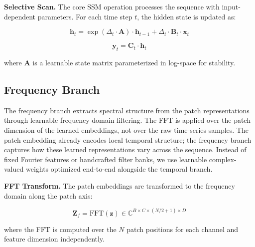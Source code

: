 \documentclass[electronics,article,submit,pdftex,moreauthors]{Definitions/mdpi}
\begin{document}
\textbf{Selective Scan.} The core SSM operation processes the sequence with input-dependent parameters. For each time step $t$, the hidden state is updated as:
\begin{linenomath}
\begin{equation}
\mathbf{h}_t = \exp(\Delta_t \cdot \mathbf{A}) \cdot \mathbf{h}_{t-1} + \Delta_t \cdot \mathbf{B}_t \cdot \mathbf{x}_t
\end{equation}
\end{linenomath}
\begin{linenomath}
\begin{equation}
\mathbf{y}_t = \mathbf{C}_t \cdot \mathbf{h}_t
\end{equation}
\end{linenomath}
where $\mathbf{A}$ is a learnable state matrix parameterized in log-space for stability.

\subsection{Frequency Branch}

The frequency branch extracts spectral structure from the patch representations through learnable frequency-domain filtering. The FFT is applied over the patch dimension of the learned embeddings, not over the raw time-series samples. The patch embedding already encodes local temporal structure; the frequency branch captures how these learned representations vary across the sequence. Instead of fixed Fourier features or handcrafted filter banks, we use learnable complex-valued weights optimized end-to-end alongside the temporal branch.

\textbf{FFT Transform.} The patch embeddings are transformed to the frequency domain along the patch axis:
\begin{linenomath}
\begin{equation}
\mathbf{Z}_f = \text{FFT}(\mathbf{z}) \in \mathbb{C}^{B \times C \times (N/2+1) \times D}
\end{equation}
\end{linenomath}
where the FFT is computed over the $N$ patch positions for each channel and feature dimension independently.
\end{document}

